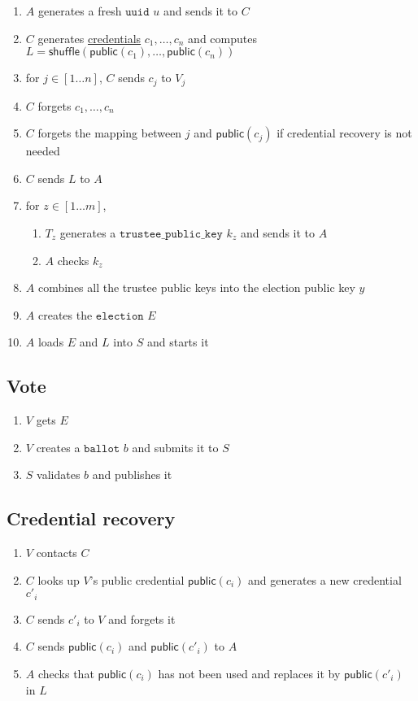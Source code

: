 \documentclass[a4paper]{article}
\newcommand{\public}{\textsf{public}}
\newcommand{\shuffle}{\textsf{shuffle}}
\newcommand{\uuid}{\texttt{uuid}}
\newcommand{\tpk}{\texttt{trustee\_public\_key}}
\newcommand{\election}{\texttt{election}}
\newcommand{\ballot}{\texttt{ballot}}
\begin{document}
\begin{enumerate}
\item $A$ generates a fresh \hyperref[basic-types]{$\uuid$} $u$ and
  sends it to $C$
\item $C$ generates \hyperref[credentials]{credentials}
  $c_1,\dots,c_n$ and computes
  $L=\shuffle(\public(c_1),\dots,\public(c_n))$
\item for $j\in[1\dots n]$, $C$ sends $c_j$ to $V_j$
\item $C$ forgets $c_1,\dots,c_n$
\item $C$ forgets the mapping between $j$ and $\public(c_j)$
  if credential recovery is not needed
\item $C$ sends $L$ to $A$
\item for $z\in[1\dots m]$,
  \begin{enumerate}
  \item $T_z$ generates a \hyperref[trustee-keys]{$\tpk$} $k_z$ and
    sends it to $A$
  \item $A$ checks $k_z$
  \end{enumerate}
\item $A$ combines all the trustee public keys into the election
  public key $y$
\item $A$ creates the \hyperref[elections]{$\election$} $E$
\item $A$ loads $E$ and $L$ into $S$ and starts it
\end{enumerate}

\subsection{Vote}

\begin{enumerate}
\item $V$ gets $E$
\item $V$ creates a \hyperref[ballots]{$\ballot$} $b$ and submits it to $S$
\item $S$ validates $b$ and publishes it
\end{enumerate}

\subsection{Credential recovery}

\begin{enumerate}
\item $V$ contacts $C$
\item $C$ looks up $V$'s public credential $\public(c_i)$ and
  generates a new credential $c'_i$
\item $C$ sends $c'_i$ to $V$ and forgets it
\item $C$ sends $\public(c_i)$ and $\public(c'_i)$ to $A$
\item $A$ checks that $\public(c_i)$ has not been used and replaces it
  by $\public(c'_i)$ in $L$
\end{enumerate}
\end{document}
